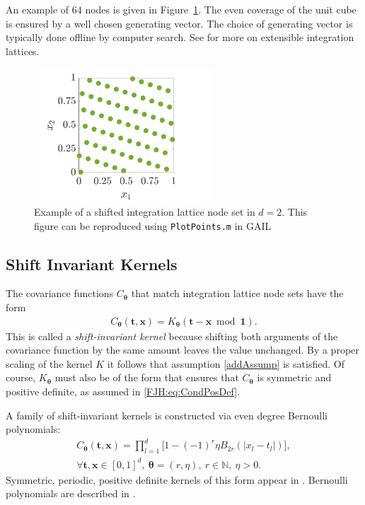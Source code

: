 \documentclass[twocolumn]{svjour3}          %
\newcommand{\bm}[1]{\boldsymbol{#1}}
\newcommand{\naturals}{\mathbb{N}}
\newcommand{\vtheta}{{\bm{\theta}}}
\newcommand{\vt}{\bm{t}}
\newcommand{\vx}{\bm{x}}
\newcommand{\vone}{\bm{1}}
\newcommand{\code}[1]{\texttt{#1}}
\newcommand\figref{Figure~\ref}
\begin{document}
An example of $64$ nodes is given in \figref{latticefig}.  The even coverage of the unit cube is ensured by a well chosen generating vector.  The choice of generating vector is typically done offline by computer search.  See \cite{DicEtal14a,HicNie03a} for more on extensible integration lattices.
\begin{figure}[htp]
	\centering
	\includegraphics[height=5cm]{ShiftedLatticePoints}
	\caption{Example of a shifted integration lattice node set  in $d=2$. 
	This figure can be reproduced using \code{PlotPoints.m} in GAIL} \label{latticefig}
\end{figure}

\subsection{Shift Invariant Kernels}
The covariance functions $C_\vtheta$ that match integration lattice node sets have the form
\begin{align} \label{eq:shInv}
C_\vtheta(\vt,\vx) = K_\vtheta(\vt - \vx \bmod \vone).
\end{align}
This is called a \emph{shift-invariant kernel} because shifting both arguments of the covariance function by the same amount leaves the value unchanged.   By a proper scaling of the kernel $K$ it follows that assumption \eqref{addAssump} is satisfied. Of course, $K_\vtheta$ must also be of the form that ensures that $C_\vtheta$ is symmetric and positive definite, as assumed in \eqref{FJH:eq:CondPosDef}. 

A family of shift-invariant kernels is constructed via even degree Bernoulli polynomials:
\begin{multline}
\label{the_kernel_eqn_bernoulli}
C_\vtheta(\vt, \vx) =
\prod_{l=1}^d \biggl[
1 - (-1)^{r} \eta B_{2r}( |{x_l-t_l}| ) \biggr], \\  
\forall \vt,\vx \in [0,1]^d, \  \vtheta = (r,\eta), \ r \in \naturals, \ \eta > 0.
\end{multline}
Symmetric, periodic, positive definite kernels of this form appear in  \cite{DicEtal14a,Hic96a}.  Bernoulli polynomials are described in \cite[Chapter 24]{OlvEtal10a}.
\end{document}
